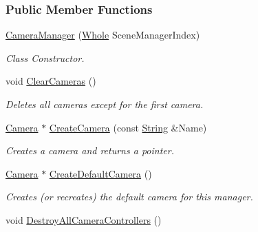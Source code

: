 \subsubsection*{Public Member Functions}
\begin{DoxyCompactItemize}
\item 
\hyperlink{classphys_1_1CameraManager_afdaf37b28708ed122f199437eb23ce32}{CameraManager} (\hyperlink{namespacephys_a460f6bc24c8dd347b05e0366ae34f34a}{Whole} SceneManagerIndex)
\begin{DoxyCompactList}\small\item\em Class Constructor. \item\end{DoxyCompactList}\item 
void \hyperlink{classphys_1_1CameraManager_a76bebee0820fcfa462412cb112b1b874}{ClearCameras} ()
\begin{DoxyCompactList}\small\item\em Deletes all cameras except for the first camera. \item\end{DoxyCompactList}\item 
\hyperlink{classphys_1_1Camera}{Camera} $\ast$ \hyperlink{classphys_1_1CameraManager_a3681545c19a96ae62032204a6f4a602b}{CreateCamera} (const \hyperlink{namespacephys_aa03900411993de7fbfec4789bc1d392e}{String} \&Name)
\begin{DoxyCompactList}\small\item\em Creates a camera and returns a pointer. \item\end{DoxyCompactList}\item 
\hyperlink{classphys_1_1Camera}{Camera} $\ast$ \hyperlink{classphys_1_1CameraManager_a80f7dd510a31264d74e7f5a53bdf86a9}{CreateDefaultCamera} ()
\begin{DoxyCompactList}\small\item\em Creates (or recreates) the default camera for this manager. \item\end{DoxyCompactList}\item 
\hypertarget{classphys_1_1CameraManager_a4ef5eda014de8f0f4fc866cd6574be96}{
void \hyperlink{classphys_1_1CameraManager_a4ef5eda014de8f0f4fc866cd6574be96}{DestroyAllCameraControllers} ()}
\label{classphys_1_1CameraManager_a4ef5eda014de8f0f4fc866cd6574be96}


\end{DoxyCompactItemize}
